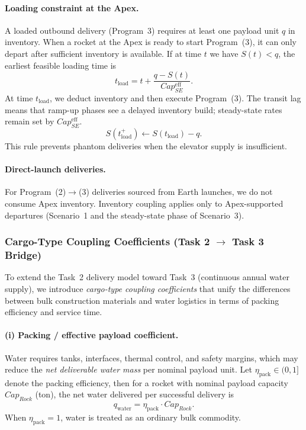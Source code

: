 ﻿\documentclass{mcmthesis}
\begin{document}
\paragraph{Loading constraint at the Apex.}
A loaded outbound delivery (Program~3) requires at least one payload unit $q$ in inventory. When a rocket at the Apex
is ready to start Program~(3), it can only depart after sufficient inventory is available.
If at time $t$ we have $S(t)<q$, the earliest feasible loading time is
\[
t_{\text{load}} = t + \frac{q - S(t)}{Cap_{SE}^{\text{eff}}}.
\]
At time $t_{\text{load}}$, we deduct inventory and then execute Program~(3). The transit lag means that ramp-up phases see a delayed inventory build; steady-state rates remain set by $Cap_{SE}^{\text{eff}}$.
\[
S(t_{\text{load}}^+) \leftarrow S(t_{\text{load}}) - q.
\]
This rule prevents phantom deliveries when the elevator supply is insufficient.

\paragraph{Direct-launch deliveries.}
For Program~(2)$\rightarrow$(3) deliveries sourced from Earth launches, we do not consume Apex inventory.
Inventory coupling applies only to Apex-supported departures (Scenario~1 and the steady-state phase of Scenario~3).
\subsubsection{Cargo-Type Coupling Coefficients (Task 2 $\rightarrow$ Task 3 Bridge)}
\label{sec:coupling_coeff}

To extend the Task~2 delivery model toward Task~3 (continuous annual water supply),
we introduce \emph{cargo-type coupling coefficients} that unify the differences between
bulk construction materials and water logistics in terms of packing efficiency and service time.

\paragraph{(i) Packing / effective payload coefficient.}
Water requires tanks, interfaces, thermal control, and safety margins, which may reduce the
\emph{net deliverable water mass} per nominal payload unit.
Let $\eta_{\text{pack}}\in(0,1]$ denote the packing efficiency, then for a rocket with nominal payload capacity
$Cap_{Rock}$ (ton), the net water delivered per successful delivery is
\begin{equation}
q_{\text{water}}=\eta_{\text{pack}}\cdot Cap_{Rock}.
\end{equation}
When $\eta_{\text{pack}}=1$, water is treated as an ordinary bulk commodity.
\end{document}
